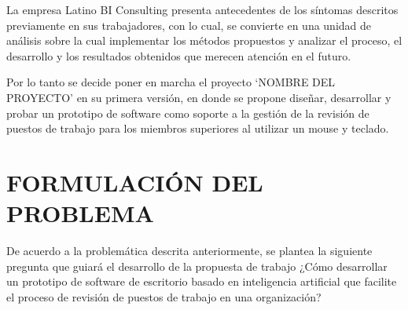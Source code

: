 La empresa Latino BI Consulting presenta antecedentes de los síntomas descritos previamente en sus trabajadores, con lo cual, se convierte en una unidad de análisis sobre la cual implementar los métodos propuestos y analizar el proceso, el desarrollo y los resultados obtenidos que merecen atención en el futuro.

Por lo tanto se decide poner en marcha el proyecto ‘NOMBRE DEL PROYECTO’ en su primera versión, en donde se propone diseñar, desarrollar y probar un prototipo de software como soporte a la gestión de la revisión de puestos de trabajo para los miembros superiores al utilizar un mouse y teclado.

\section{FORMULACIÓN DEL PROBLEMA}
De acuerdo a la problemática descrita anteriormente, se plantea la siguiente pregunta que guiará el desarrollo de la propuesta de trabajo ¿Cómo desarrollar un prototipo de software de escritorio basado en inteligencia artificial que facilite el proceso de revisión de puestos de trabajo en una organización?